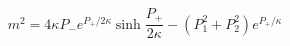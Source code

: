 \begin{equation}\label{6}
 m^2=4\kappa
P_{-}e^{P_{+}/2\kappa}\sinh{\frac{P_{+}}{2\kappa}}-\left(P_1^2+P_2^2\right)e^{P_{+}/\kappa}
\end{equation}

